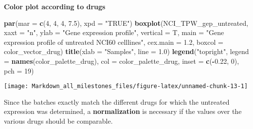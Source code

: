 \documentclass[]{article}
\newenvironment{Shaded}{\begin{snugshade}}{\end{snugshade}}
\newcommand{\DataTypeTok}[1]{\textcolor[rgb]{0.13,0.29,0.53}{#1}}
\newcommand{\DecValTok}[1]{\textcolor[rgb]{0.00,0.00,0.81}{#1}}
\newcommand{\FloatTok}[1]{\textcolor[rgb]{0.00,0.00,0.81}{#1}}
\newcommand{\KeywordTok}[1]{\textcolor[rgb]{0.13,0.29,0.53}{\textbf{#1}}}
\newcommand{\NormalTok}[1]{#1}
\newcommand{\OperatorTok}[1]{\textcolor[rgb]{0.81,0.36,0.00}{\textbf{#1}}}
\newcommand{\StringTok}[1]{\textcolor[rgb]{0.31,0.60,0.02}{#1}}
\begin{document}
\textbf{Color plot according to drugs}

\begin{Shaded}
\begin{Highlighting}[]
\KeywordTok{par}\NormalTok{(}\DataTypeTok{mar =} \KeywordTok{c}\NormalTok{(}\DecValTok{4}\NormalTok{, }\DecValTok{4}\NormalTok{, }\DecValTok{4}\NormalTok{, }\FloatTok{7.5}\NormalTok{), }\DataTypeTok{xpd =} \StringTok{"TRUE"}\NormalTok{)}
\KeywordTok{boxplot}\NormalTok{(NCI_TPW_gep_untreated, }
        \DataTypeTok{xaxt =} \StringTok{"n"}\NormalTok{, }
        \DataTypeTok{ylab =} \StringTok{"Gene expression profile"}\NormalTok{, }
        \DataTypeTok{vertical =}\NormalTok{  T, }
        \DataTypeTok{main =} \StringTok{"Gene expression profile of untreated NCI60 celllines"}\NormalTok{, }
        \DataTypeTok{cex.main =} \FloatTok{1.2}\NormalTok{,}
        \DataTypeTok{boxcol =}\NormalTok{ color_vector_drug)}
\KeywordTok{title}\NormalTok{(}\DataTypeTok{xlab =} \StringTok{"Samples"}\NormalTok{, }\DataTypeTok{line =} \FloatTok{1.0}\NormalTok{)}
\KeywordTok{legend}\NormalTok{(}\StringTok{"topright"}\NormalTok{, }
       \DataTypeTok{legend =} \KeywordTok{names}\NormalTok{(color_palette_drug), }
       \DataTypeTok{col =}\NormalTok{ color_palette_drug,}
       \DataTypeTok{inset =} \KeywordTok{c}\NormalTok{(}\OperatorTok{-}\FloatTok{0.22}\NormalTok{, }\DecValTok{0}\NormalTok{),}
       \DataTypeTok{pch =} \DecValTok{19}\NormalTok{)}
\end{Highlighting}
\end{Shaded}

\begin{center}\texttt{[image: Markdown\_all\_milestones\_files/figure-latex/unnamed-chunk-13-1]} \end{center}

Since the batches exactly match the different drugs for which the
untreated expression was determined, a \textbf{normalization} is
necessary if the values over the various drugs should be comparable.
\end{document}
